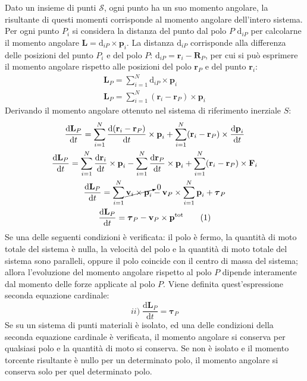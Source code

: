 \documentclass{article}
\newcommand{\vect}[1]{\boldsymbol{\mathbf{#1}}}
\newcommand{\df}{\mathrm{d}}
\numberwithin{equation}{subsection}
\begin{document}
Dato un insieme di punti $\mathscr{S}$, ogni punto ha un suo momento angolare, la risultante di questi momenti corrisponde al momento angolare dell'intero sistema. 
Per ogni punto $P_i$ si considera la distanza del punto dal polo $P$ $\vect{\df}_{iP}$ per calcolarne il momento angolare $\vect{L}=\vect{\df}_{iP}\times\vect{p}_i$. La distanza $\vect{\df}_{iP}$ 
corrisponde alla differenza delle posizioni del punto $P_i$ e del polo $P$: $\vect{\df}_{iP}=\vect{r}_i-\vect{R}_P$, per cui si può esprimere il momento angolare rispetto alle 
posizioni del polo $\vect{r}_P$ e del punto $\vect{r}_i$: 
\begin{gather*}
    \vect{L}_P=\displaystyle\sum_{i=1}^{N}\vect{\df}_{iP}\times\vect{p}_i\\
    \vect{L}_P=\displaystyle\sum_{i=1}^N(\vect{r}_i-\vect{r}_P)\times\vect{p}_i
\end{gather*}
Derivando il momento angolare ottenuto nel sistema di riferimento inerziale $S$: 
\begin{gather*}
    \displaystyle\frac{\df\vect{L}_P}{\df t}=\sum_{i=1}^N\frac{\df(\vect{r}_i-\vect{r}_P)}{\df t}\times\vect{p}_i+\sum_{i=1}^N(\vect{r}_i-\vect{r}_P)\times\frac{\df\vect{p}_i}{\df t}\\
    \displaystyle\frac{\df\vect{L}_P}{\df t}=\sum_{i=1}^N\frac{\df\vect{r}_i}{\df t}\times\vect{p}_i-\sum_{i=1}^N\frac{\df\vect{r}_P}{\df t}\times\vect{p}_i+\sum_{i=1}^N(\vect{r}_i-\vect{r}_P)\times\vect{F}_i\\
    \displaystyle\frac{\df\vect{L}_P}{\df t}=\sum_{i=1}^N\cancelto{0}{\vect{v}_i\times\vect{p}_i}-\vect{v}_P\times\sum_{i=1}^N\vect{p}_i+\vect{\tau}_P\\
    \displaystyle\frac{\df\vect{L}_P}{\df t}=\vect{\tau}_P-\vect{v}_P\times\vect{p}^\mathrm{tot}\tag{\stepcounter{equation}\theequation}
\end{gather*}
Se una delle seguenti condizioni è verificata: il polo è fermo, la quantità di moto totale del sistema è 
nulla, la velocità del polo e la quantità di moto 
totale del sistema sono paralleli, oppure il polo coincide con 
il centro di massa del sistema; allora l'evoluzione del momento angolare rispetto al polo $P$ dipende interamente dal momento delle forze applicate al polo $P$. Viene 
definita quest'espressione seconda equazione cardinale:  
\begin{equation*}
    ii)\;\displaystyle\frac{\df\vect{L}_P}{\df t}=\vect{\tau}_P
\end{equation*}
Se su un sistema di punti materiali è isolato, ed una delle condizioni della seconda equazione cardinale è verificata, il momento angolare si conserva per qualsiasi polo e la 
quantità di moto si conserva. Se non è isolato e il momento torcente risultante è nullo per un determinato polo, il momento angolare si conserva solo per quel determinato 
polo. 
\end{document}

